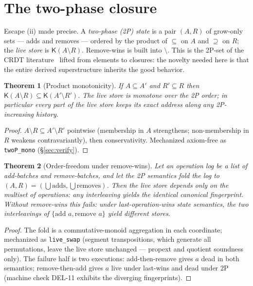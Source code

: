 \documentclass[11pt]{article}
\newtheorem{theorem}{Theorem}
\theoremstyle{definition}
\theoremstyle{remark}
\newcommand{\K}{\mathsf{K}}
\newcommand{\diffop}{\setminus}
\newcommand{\sub}{\subseteq}
\begin{document}
\section{The two-phase closure}\label{sec:twop}

Escape (ii) made precise. A \emph{two-phase (2P) state} is a pair $(A, R)$ of grow-only sets --- adds and removes --- ordered by the product of $\sub$ on $A$ and $\supseteq$ on $R$; the \emph{live store} is $\K(A \diffop R)$. Remove-wins is built into $\diffop$. This is the 2P-set of the CRDT literature~\cite{Shapiro11} lifted from elements to closures: the novelty needed here is that the entire derived superstructure inherits the good behavior.

\begin{theorem}[Product monotonicity]\label{thm:product}
If $A \sub A'$ and $R' \sub R$ then $\K(A \diffop R) \sub \K(A' \diffop R')$. The live store is monotone over the 2P order; in particular every part of the live store keeps its exact address along any 2P-increasing history.
\end{theorem}

\begin{proof}
$A \diffop R \sub A' \diffop R'$ pointwise (membership in $A$ strengthens; non-membership in $R$ weakens contravariantly), then conservativity. Mechanized axiom-free as \texttt{twoP\_mono} (\S\ref{sec:verify}).
\end{proof}

\begin{theorem}[Order-freedom under remove-wins]\label{thm:orderfree}
Let an operation log be a list of add-batches and remove-batches, and let the 2P semantics fold the log to $(A, R) = (\bigcup \text{adds}, \bigcup \text{removes})$. Then the live store depends only on the multiset of operations: any interleaving yields the identical canonical fingerprint. Without remove-wins this fails: under last-operation-wins state semantics, the two interleavings of $\{\text{add } a, \text{remove } a\}$ yield different stores.
\end{theorem}

\begin{proof}
The fold is a commutative-monoid aggregation in each coordinate; mechanized as \texttt{live\_swap} (segment transpositions, which generate all permutations, leave the live store unchanged --- propext and quotient soundness only). The failure half is two executions: add-then-remove gives $a$ dead in both semantics; remove-then-add gives $a$ live under last-wins and dead under 2P (machine check DEL-11 exhibits the diverging fingerprints).
\end{proof}
\end{document}
